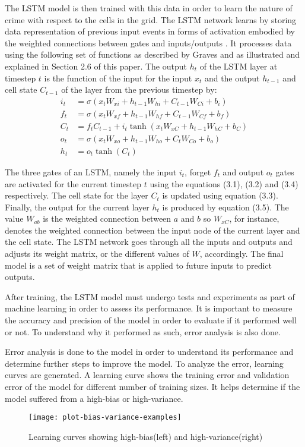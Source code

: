 The LSTM model is then trained with this data in order to learn the nature of crime with respect to the cells in the grid. The LSTM network learns by storing data representation of previous input events in forms of activation embodied by the weighted connections between gates and inputs/outputs \citep{hochreiter1997long}. It processes data using the following set of functions as described by Graves \citeyearpar{graves2013generating} and as illustrated and explained in Section 2.6 of this paper. The output \( h_t \) of the LSTM layer at timestep $t$ is the function of the input for the input \( x_t \) and the output \( h_{t-1} \) and cell state \( C_{t-1} \) of the layer from the previous timestep by:
    \begin{align}
    i_t &= \sigma(x_t W_{xi} + h_{t-1} W_{hi} + C_{t-1} W_{Ci} + b_i) \\
    f_t &= \sigma(x_t W_{xf} + h_{t-1} W_{hf} + C_{t-1} W_{Cf} + b_f) \\
    C_t &= f_t C_{t-1} + i_t \tanh(x_t W_{xC} + h_{t-1} W_{hC} + b_C) \\
    o_t &= \sigma(x_t W_{xo} + h_{t-1} W_{ho} + C_t W_{Co} + b_o) \\
    h_t &= o_t \tanh(C_t)
    \end{align}

The three gates of an LSTM, namely the input \( i_t \), forget \( f_t \) and output \( o_t \) gates are activated for the current timestep $t$ using the equations (3.1), (3.2) and (3.4) respectively. The cell state for the layer \( C_t \) is updated using equation (3.3). Finally, the output for the current layer \( h_t \) is produced by equation (3.5). The value \(W_{ab}\) is the weighted connection between $a$ and $b$ so \(W_{xC}\), for instance, denotes the weighted connection between the input node of the current layer and the cell state. The LSTM network goes through all the inputs and outputs and adjusts its weight matrix, or the different values of $W$, accordingly. The final model is a set of weight matrix that is applied to future inputs to predict outputs.

After training, the LSTM model must undergo tests and experiments as part of machine learning in order to assess its performance. It is important to measure the accuracy and precision of the model in order to evaluate if it performed well or not. To understand why it performed as such, error analysis is also done.

Error analysis is done to the model in order to understand its performance and determine further steps to improve the model. To analyze the error, learning curves are generated. A learning curve shows the training error and validation error of the model for different number of training sizes. It helps determine if the model suffered from a high-bias or high-variance.
\begin{figure}[H]
    \centering
    \texttt{[image: plot-bias-variance-examples]}
    \caption{Learning curves showing high-bias(left) and high-variance(right) \citep{scikit-learn}}
\end{figure}

